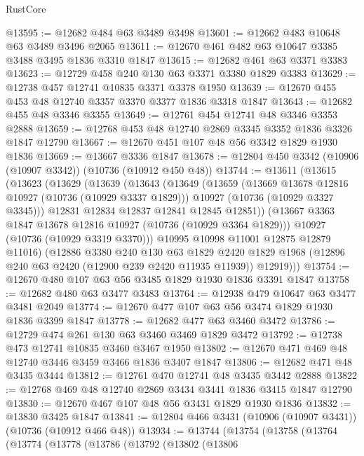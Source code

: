 \begin{lexlean}{RustCore}
\begin{coremodule}
@13595 := @12682 @484 @63 @3489 @3498
@13601 := @12662 @483 @10648 @63 @3489 @3496 @2065
@13611 := @12670 @461 @482 @63 @10647 @3385 @3488 @3495 @1836 @3310 @1847
@13615 := @12682 @461 @63 @3371 @3383
@13623 := @12729 @458 @240 @130 @63 @3371 @3380 @1829 @3383
@13629 := @12738 @457 @12741 @10835 @3371 @3378 @1950
@13639 := @12670 @455 @453 @48 @12740 @3357 @3370 @3377 @1836 @3318 @1847
@13643 := @12682 @455 @48 @3346 @3355
@13649 := @12761 @454 @12741 @48 @3346 @3353 @2888
@13659 := @12768 @453 @48 @12740 @2869 @3345 @3352 @1836 @3326 @1847 @12790
@13667 := @12670 @451 @107 @48 @56 @3342 @1829 @1930 @1836
@13669 := @13667 @3336 @1847
@13678 := @12804 @450 @3342 (@10906 (@10907 @3342)) (@10736 (@10912 @450 @48))
@13744 := @13611
    (@13615
      (@13623
        (@13629
          (@13639
            (@13643
              (@13649
                (@13659
                  (@13669 @13678 @12816 @10927 (@10736 (@10929 @3337 @1829)))
                  @10927
                  (@10736 (@10929 @3327 @3345)))
                @12831
                @12834
                @12837
                @12841
                @12845
                @12851))
            (@13667 @3363 @1847 @13678 @12816 @10927 (@10736 (@10929 @3364 @1829)))
            @10927
            (@10736 (@10929 @3319 @3370)))
          @10995
          @10998
          @11001
          @12875
          @12879
          @11016)
        (@12886
          @3380
          @240
          @130
          @63
          @1829
          @2420
          @1829
          @1968
          (@12896 @240 @63 @2420 (@12900 @239 @2420 @11935 @11939))
          @12919)))
@13754 := @12670 @480 @107 @63 @56 @3485 @1829 @1930 @1836 @3391 @1847
@13758 := @12682 @480 @63 @3477 @3483
@13764 := @12938 @479 @10647 @63 @3477 @3481 @2049
@13774 := @12670 @477 @107 @63 @56 @3474 @1829 @1930 @1836 @3399 @1847
@13778 := @12682 @477 @63 @3460 @3472
@13786 := @12729 @474 @261 @130 @63 @3460 @3469 @1829 @3472
@13792 := @12738 @473 @12741 @10835 @3460 @3467 @1950
@13802 := @12670 @471 @469 @48 @12740 @3446 @3459 @3466 @1836 @3407 @1847
@13806 := @12682 @471 @48 @3435 @3444
@13812 := @12761 @470 @12741 @48 @3435 @3442 @2888
@13822 := @12768 @469 @48 @12740 @2869 @3434 @3441 @1836 @3415 @1847 @12790
@13830 := @12670 @467 @107 @48 @56 @3431 @1829 @1930 @1836
@13832 := @13830 @3425 @1847
@13841 := @12804 @466 @3431 (@10906 (@10907 @3431)) (@10736 (@10912 @466 @48))
@13934 := @13744
    (@13754
      (@13758
        (@13764
          (@13774
            (@13778
              (@13786
                (@13792
                  (@13802
                    (@13806

\end{coremodule}
\end{lexlean}
